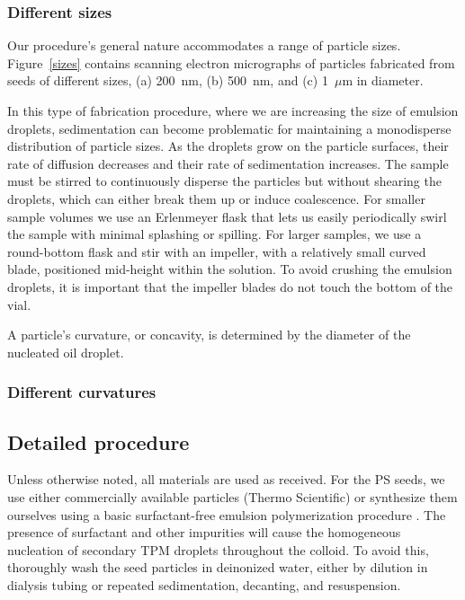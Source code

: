 \documentclass[aps,pre,preprint,superscriptaddress,nofootinbib]{revtex4-1}
\begin{document}

\subsubsection{Different sizes}

Our procedure's general nature accommodates a range of particle sizes.
Figure~\ref{sizes} contains scanning electron micrographs of particles fabricated from seeds of different sizes, (a) 200~nm, (b) 500~nm, and (c) 1~$\mu$m in diameter.

In this type of fabrication procedure, where we are increasing the size of emulsion droplets, sedimentation can become problematic for maintaining a monodisperse distribution of particle sizes.
As the droplets grow on the particle surfaces, their rate of diffusion decreases and their rate of sedimentation increases.
The sample must be stirred to continuously disperse the particles but without shearing the droplets, which can either break them up or induce coalescence.
For smaller sample volumes we use an Erlenmeyer flask that lets us easily periodically swirl the sample with minimal splashing or spilling.
For larger samples, we use a round-bottom flask and stir with an impeller, with a relatively small curved blade, positioned mid-height within the solution.
To avoid crushing the emulsion droplets, it is important that the impeller blades do not touch the bottom of the vial.


A particle's curvature, or concavity, is determined by the diameter of the nucleated oil droplet.

\subsubsection{Different curvatures}




\subsection{Detailed procedure}

Unless otherwise noted, all materials are used as received.
For the PS seeds, we use either commercially available particles (Thermo Scientific) or synthesize them ourselves using a basic surfactant-free emulsion polymerization procedure \cite{Song1990Kinetics}.
The presence of surfactant and other impurities will cause the homogeneous nucleation of secondary TPM droplets throughout the colloid.
To avoid this, thoroughly wash the seed particles in deinonized water, either by dilution in dialysis tubing or repeated sedimentation, decanting, and resuspension.
\end{document}
